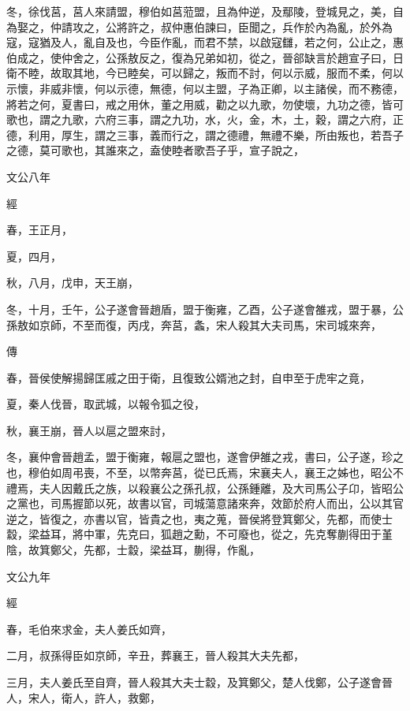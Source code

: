 \documentclass[fontset = none]{ctexart}
\begin{document}
冬，徐伐莒，莒人來請盟，穆伯如莒蒞盟，且為仲逆，及鄢陵，登城見之，美，自為娶之，仲請攻之，公將許之，叔仲惠伯諫曰，臣聞之，兵作於內為亂，於外為寇，寇猶及人，亂自及也，今臣作亂，而君不禁，以啟寇讎，若之何，公止之，惠伯成之，使仲舍之，公孫敖反之，復為兄弟如初，從之，晉郤缺言於趙宣子曰，日衛不睦，故取其地，今已睦矣，可以歸之，叛而不討，何以示威，服而不柔，何以示懷，非威非懷，何以示德，無德，何以主盟，子為正卿，以主諸侯，而不務德，將若之何，夏書曰，戒之用休，董之用威，勸之以九歌，勿使壞，九功之德，皆可歌也，謂之九歌，六府三事，謂之九功，水，火，金，木，土，穀，謂之六府，正德，利用，厚生，謂之三事，義而行之，謂之德禮，無禮不樂，所由叛也，若吾子之德，莫可歌也，其誰來之，盍使睦者歌吾子乎，宣子說之，





文公八年


經



春，王正月，

夏，四月，

秋，八月，戊申，天王崩，

冬，十月，壬午，公子遂會晉趙盾，盟于衡雍，乙酉，公子遂會雒戎，盟于暴，公孫敖如京師，不至而復，丙戌，奔莒，螽，宋人殺其大夫司馬，宋司城來奔，

傳



春，晉侯使解揚歸匡戚之田于衛，且復致公婿池之封，自申至于虎牢之竟，

夏，秦人伐晉，取武城，以報令狐之役，

秋，襄王崩，晉人以扈之盟來討，

冬，襄仲會晉趙孟，盟于衡雍，報扈之盟也，遂會伊雒之戎，書曰，公子遂，珍之也，穆伯如周弔喪，不至，以幣奔莒，從已氏焉，宋襄夫人，襄王之姊也，昭公不禮焉，夫人因戴氏之族，以殺襄公之孫孔叔，公孫鍾離，及大司馬公子卬，皆昭公之黨也，司馬握節以死，故書以官，司城蕩意諸來奔，效節於府人而出，公以其官逆之，皆復之，亦書以官，皆貴之也，夷之蒐，晉侯將登箕鄭父，先都，而使士縠，梁益耳，將中軍，先克曰，狐趙之勳，不可廢也，從之，先克奪蒯得田于堇陰，故箕鄭父，先都，士縠，梁益耳，蒯得，作亂，





文公九年


經



春，毛伯來求金，夫人姜氏如齊，

二月，叔孫得臣如京師，辛丑，葬襄王，晉人殺其大夫先都，

三月，夫人姜氏至自齊，晉人殺其大夫士縠，及箕鄭父，楚人伐鄭，公子遂會晉人，宋人，衛人，許人，救鄭，
\end{document}
